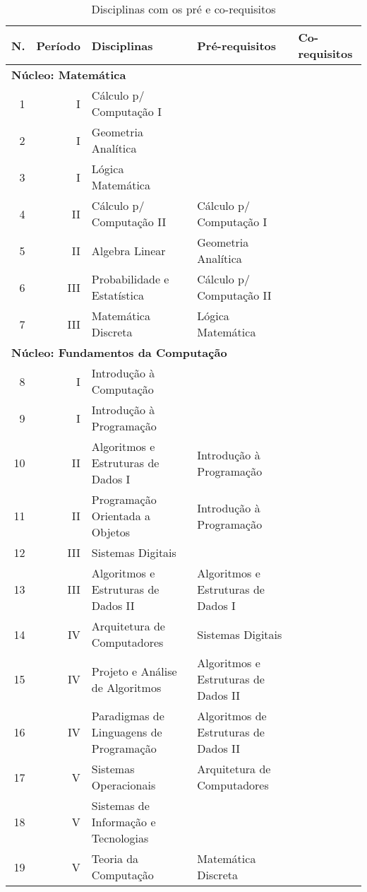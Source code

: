 \documentclass[
	12pt,				%
	openright,			%
  oneside,     %
	a4paper,			%
	english,			%
	french,				%
	spanish,			%
	brazil				%
	]{abntex2}
\begin{document}
\begin{apendicesenv}
\begin{landscape}
    \begin{longtable}{r|r|l|l|l}
     \caption{Disciplinas com os pré e co-requisitos}
     \label{ltab:PreReq}
     \\
     \hline
    \textbf{N.} & \textbf{Período} & \textbf{Disciplinas} & \textbf{Pré-requisitos} & \textbf{Co-requisitos} \\
\hline
\multicolumn{5}{l}{\textbf{Núcleo: Matemática}}\\ \hline
    1     & I     & Cálculo p/ Computação I &       &       \\ \hline
    2     & I     & Geometria Analítica &       &        \\ \hline
    3     & I     & Lógica Matemática &       &        \\ \hline
    4     & II    & Cálculo p/ Computação II & Cálculo p/ Computação I &       \\ \hline
    5     & II    & Algebra Linear & Geometria Analítica &        \\ \hline
    6     & III   & Probabilidade e Estatística & Cálculo p/ Computação II &       \\ \hline
    7     & III   & Matemática Discreta & Lógica Matemática &        \\ \hline

\multicolumn{5}{l}{\textbf{Núcleo: Fundamentos da Computação}}\\ \hline
    8     & I     & Introdução à Computação &       &        \\ \hline
    9     & I     & Introdução à Programação &       &      \\ \hline
    10    & II    & Algoritmos e Estruturas de Dados I & Introdução à Programação &       \\ \hline
    11    & II    & Programação Orientada a Objetos & Introdução à Programação &       \\ \hline
    12    & III   & Sistemas Digitais & 	 &       \\ \hline
    13    & III   & Algoritmos e Estruturas de Dados II & Algoritmos e Estruturas de Dados I &       \\ \hline
    14    & IV    & Arquitetura de Computadores & Sistemas Digitais &       \\ \hline
    15    & IV    & Projeto e Análise de Algoritmos & Algoritmos e Estruturas de Dados II &       \\ \hline
    16    & IV    & Paradigmas de Linguagens de Programação & Algoritmos de Estruturas de Dados II &       \\ \hline
    17    & V     & Sistemas Operacionais & Arquitetura de Computadores &       \\ \hline
    18    & V     & Sistemas de Informação e Tecnologias &       &       \\ \hline
    19    & V     & Teoria da Computação & Matemática Discreta &        \\ \hline


\end{longtable}
\end{landscape}
\end{apendicesenv}
\end{document}
